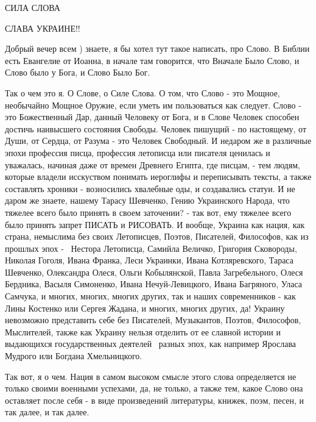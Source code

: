  
 
 
 
 

СИЛА СЛОВА

СЛАВА УКРАИНЕ!! 💛 💙 💛 💙 💛 💙 💛 💙 💛 💙 💛 💙 💛 💙 💛 💙 💛 💙 💛 💙 💛
💛 💙 💛 💛 💙 💛 💙 💛 💙 💛 💙 💛 💙 💛 💙 💛 💙

Добрый вечер всем ) знаете, я бы хотел тут такое написать, про Слово.  В Библии
есть Евангелие от Иоанна, в начале там говорится, что Вначале Было Слово, и
Слово было у Бога, и Слово Было Бог.

Так о чем это я. О Слове, о Силе Слова. О том, что Слово - это Мощное,
необычайно Мощное Оружие, если уметь им пользоваться как следует. Слово - это
Божественный Дар, данный Человеку от Бога, и в Слове Человек способен достичь
наивысшего состояния Свободы. Человек пишущий - по настоящему, от Души, от
Сердца, от Разума - это Человек Свободный. И недаром же в различные эпохи
профессия писца, профессия летописца или писателя ценилась и уважалась, начиная
даже от времен Древнего Египта, где писцам, - тем людям, которые владели
исскуством понимать иероглифы и переписывать тексты, а также составлять хроники
- возносились хвалебные оды, и создавались статуи. И не даром же знаете, нашему
Тарасу Шевченко, Гению Украинского Народа, что тяжелее всего было принять в
своем заточении? - так вот, ему тяжелее всего было принять запрет ПИСАТЬ и
РИСОВАТЬ. И вообще, Украина как нация, как страна, немыслима без своих
Летописцев, Поэтов, Писателей, Философов, как из прошлых эпох -  Нестора
Летописца, Самийла Величко, Григория Сковороды, Николая Гоголя, Ивана Франка,
Леси Украинки, Ивана Котляревского, Тараса Шевченко, Олександра Олеся, Ольги
Кобылянской, Павла Загребельного, Олеся Бердника, Васыля Симоненко, Ивана
Нечуй-Левицкого, Ивана Багряного, Уласа Самчука, и многих, многих, многих
других, так и наших современников - как Лины Костенко или Сергея Жадана, и
многих, многих других, да! Украину невозможно представить себе без Писателей,
Музыкантов, Поэтов, Философов, Мыслителей, также как Украину нельзя отделить от
ее славной истории и выдающихся государственных деятелей  разных эпох, как
например Ярослава Мудрого или Богдана Хмельницкого.

Так вот, я о чем. Нация в самом высоком смысле этого слова определяется не
только своими военными успехами, да, не только, а также тем, какое Слово она
оставляет после себя - в виде произведений литературы, книжек, поэм, песен, и
так далее, и так далее.

